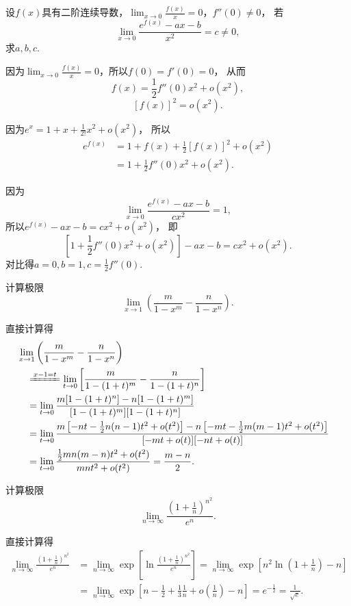 \begin{example}
\def\l{\lim_{x\to0}}
设\(f(x)\)具有二阶连续导数，\(\l \frac{f(x)}{x} = 0\)，\(f''(0)\neq0\)，
若\[
	\l \frac{e^{f(x)}-ax-b}{x^2} = c \neq 0,
\]
求\(a,b,c\).
\begin{solution}
因为\(\l \frac{f(x)}{x} = 0\)，所以\(f(0) = f'(0) = 0\)，
从而\[
	f(x) = \frac{1}{2} f''(0) x^2 + o(x^2),
\]\[
	[f(x)]^2 = o(x^2).
\]

因为\(e^x = 1 + x + \frac{1}{2!} x^2 + o(x^2)\)，
所以\begin{align*}
	e^{f(x)} &= 1 + f(x) + \frac{1}{2} [f(x)]^2 + o(x^2) \\
	&= 1 + \frac{1}{2} f''(0) x^2 + o(x^2).
\end{align*}

因为\[
	\l \frac{e^{f(x)} - ax - b}{c x^2} = 1,
\]
所以\(e^{f(x)} - ax - b = c x^2 + o(x^2)\)，
即\[
	\left[ 1 + \frac{1}{2} f''(0) x^2 + o(x^2) \right] - ax - b = c x^2 + o(x^2).
\]
对比得\(a = 0, b = 1, c = \frac{1}{2} f''(0)\).
\end{solution}
\end{example}

\begin{example}
计算极限\[
	\lim_{x\to1} \left(\frac{m}{1-x^m} - \frac{n}{1-x^n}\right).
\]
\begin{solution}
直接计算得
\begin{align*}
	&\hspace{-10pt}
	\lim_{x\to1} \left(\frac{m}{1-x^m} - \frac{n}{1-x^n}\right) \\
	&\xlongequal{x-1=t}
	\lim_{t\to0} \left[\frac{m}{1-(1+t)^m}-\frac{n}{1-(1+t)^n}\right] \\
	&=
	\lim_{t\to0} \frac{m[1-(1+t)^n]-n[1-(1+t)^m]}{[1-(1+t)^m][1-(1+t)^n]} \\
	&=
	\lim_{t\to0} \frac{m\left[-nt-\frac{1}{2}n(n-1)t^2+o(t^2)\right]
		-n\left[-mt-\frac{1}{2}m(m-1)t^2+o(t^2)\right]}{[-mt+o(t)][-nt+o(t)]} \\
	&=
	\lim_{t\to0} \frac{\frac{1}{2}mn(m-n)t^2+o(t^2)}{mnt^2+o(t^2)}
	= \frac{m-n}{2}.
\end{align*}
\end{solution}
\end{example}

\begin{example}
\def\l{\lim_{n\to\infty}}%
计算极限\[
	\l \frac{\left(1+\frac{1}{n}\right)^{n^2}}{e^n}.
\]
\begin{solution}
直接计算得
\begin{align*}
	\l \frac{\left(1+\frac{1}{n}\right)^{n^2}}{e^n}
	&= \l \exp[\ln\frac{\left(1+\frac{1}{n}\right)^{n^2}}{e^n}]
	= \l \exp[ n^2 \ln(1+\frac{1}{n}) - n ] \\
	&= \l \exp[ n - \frac{1}{2} + \frac{1}{3} \frac{1}{n} + o\left(\frac{1}{n}\right) - n ]
	= e^{-\frac{1}{2}}
	= \frac{1}{\sqrt{e}}.
\end{align*}
\end{solution}
\end{example}

